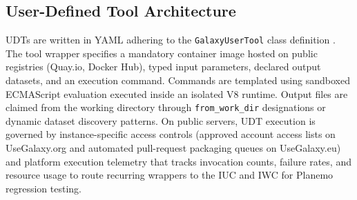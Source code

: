 \documentclass[11pt,letterpaper]{article}
\newcommand{\tool}[1]{\textsf{#1}}
\begin{document}
\subsection*{User-Defined Tool Architecture}
UDTs are written in YAML adhering to the \texttt{GalaxyUserTool} class definition \cite{galaxyudt2026}. The tool wrapper specifies a mandatory container image hosted on public registries (Quay.io, Docker Hub), typed input parameters, declared output datasets, and an execution command. Commands are templated using sandboxed ECMAScript evaluation executed inside an isolated V8 runtime. Output files are claimed from the working directory through \texttt{from\_work\_dir} designations or dynamic dataset discovery patterns. On public servers, UDT execution is governed by instance-specific access controls (approved account access lists on UseGalaxy.org and automated pull-request packaging queues on UseGalaxy.eu) and platform execution telemetry that tracks invocation counts, failure rates, and resource usage to route recurring wrappers to the IUC \cite{iuc2026} and IWC \cite{iwc2026} for \tool{Planemo} \cite{bray2023planemo} regression testing.
\end{document}
